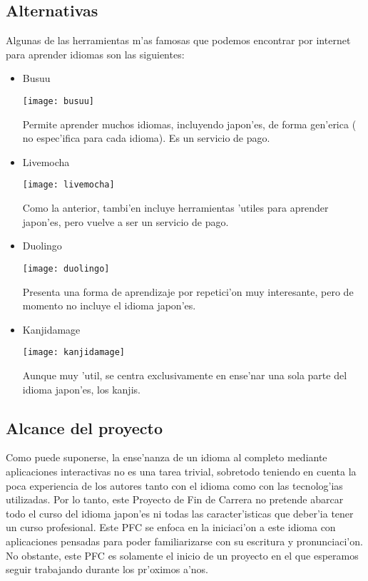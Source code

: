 \subsection{Alternativas}
\label{sub:alternativas}
Algunas de las herramientas m'as famosas que podemos encontrar por internet para aprender idiomas son las siguientes:
\begin{itemize}
 \item Busuu

 \begin{center}
 \texttt{[image: busuu]}
 \end{center}

 Permite aprender muchos idiomas, incluyendo japon'es, de forma gen'erica ( no espec'ifica para cada idioma). Es un servicio de pago.
 \item Livemocha

 \begin{center}
 \texttt{[image: livemocha]}
 \end{center}

 Como la anterior, tambi'en incluye herramientas 'utiles para aprender japon'es, pero vuelve a ser un servicio de pago.
 \item Duolingo
 
 \begin{center}
 \texttt{[image: duolingo]}
 \end{center}
 
 Presenta una forma de aprendizaje por repetici'on muy interesante, pero de momento no incluye el idioma japon'es.
 \item Kanjidamage
 
 \begin{center}
 \texttt{[image: kanjidamage]}
 \end{center}
 
 Aunque muy 'util, se centra exclusivamente en ense'nar una sola parte del idioma japon'es, los kanjis.
\end{itemize}


\subsection{Alcance del proyecto}
\label{sub:alcance_del_proyecto}
Como puede suponerse, la ense'nanza de un idioma al completo mediante aplicaciones interactivas no es
una tarea trivial, sobretodo teniendo en cuenta la poca experiencia de los autores tanto con el idioma
como con las tecnolog'ias utilizadas. Por lo tanto, este Proyecto de Fin de Carrera no pretende abarcar todo el
curso del idioma japon'es ni todas las caracter'isticas que deber'ia tener un curso profesional.
Este PFC se enfoca en la iniciaci'on a este idioma con aplicaciones pensadas para poder familiarizarse
con su escritura y pronunciaci'on. No obstante, este PFC es solamente el inicio de un proyecto en el que
esperamos seguir trabajando durante los pr'oximos a'nos.

